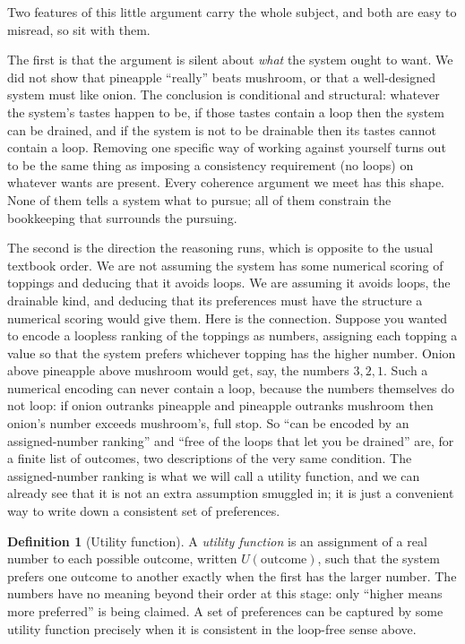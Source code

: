\documentclass[10pt]{article}
\theoremstyle{definition}
\newtheorem{definition}[theorem]{Definition}
\theoremstyle{remark}
\begin{document}
Two features of this little argument carry the whole subject, and both are easy to misread, so sit with them.

The first is that the argument is silent about \emph{what} the system ought to want. We did not show that pineapple ``really'' beats mushroom, or that a well-designed system must like onion. The conclusion is conditional and structural: whatever the system's tastes happen to be, if those tastes contain a loop then the system can be drained, and if the system is not to be drainable then its tastes cannot contain a loop. Removing one specific way of working against yourself turns out to be the same thing as imposing a consistency requirement (no loops) on whatever wants are present. Every coherence argument we meet has this shape. None of them tells a system what to pursue; all of them constrain the bookkeeping that surrounds the pursuing.

The second is the direction the reasoning runs, which is opposite to the usual textbook order. We are not assuming the system has some numerical scoring of toppings and deducing that it avoids loops. We are assuming it avoids loops, the drainable kind, and deducing that its preferences must have the structure a numerical scoring would give them. Here is the connection. Suppose you wanted to encode a loopless ranking of the toppings as numbers, assigning each topping a value so that the system prefers whichever topping has the higher number. Onion above pineapple above mushroom would get, say, the numbers $3, 2, 1$. Such a numerical encoding can never contain a loop, because the numbers themselves do not loop: if onion outranks pineapple and pineapple outranks mushroom then onion's number exceeds mushroom's, full stop. So ``can be encoded by an assigned-number ranking'' and ``free of the loops that let you be drained'' are, for a finite list of outcomes, two descriptions of the very same condition. The assigned-number ranking is what we will call a utility function, and we can already see that it is not an extra assumption smuggled in; it is just a convenient way to write down a consistent set of preferences.

\begin{definition}[Utility function]
\label{def:utility}
A \emph{utility function} is an assignment of a real number to each possible outcome, written $U(\text{outcome})$, such that the system prefers one outcome to another exactly when the first has the larger number. The numbers have no meaning beyond their order at this stage: only ``higher means more preferred'' is being claimed. A set of preferences can be captured by some utility function precisely when it is consistent in the loop-free sense above.
\end{definition}
\end{document}
